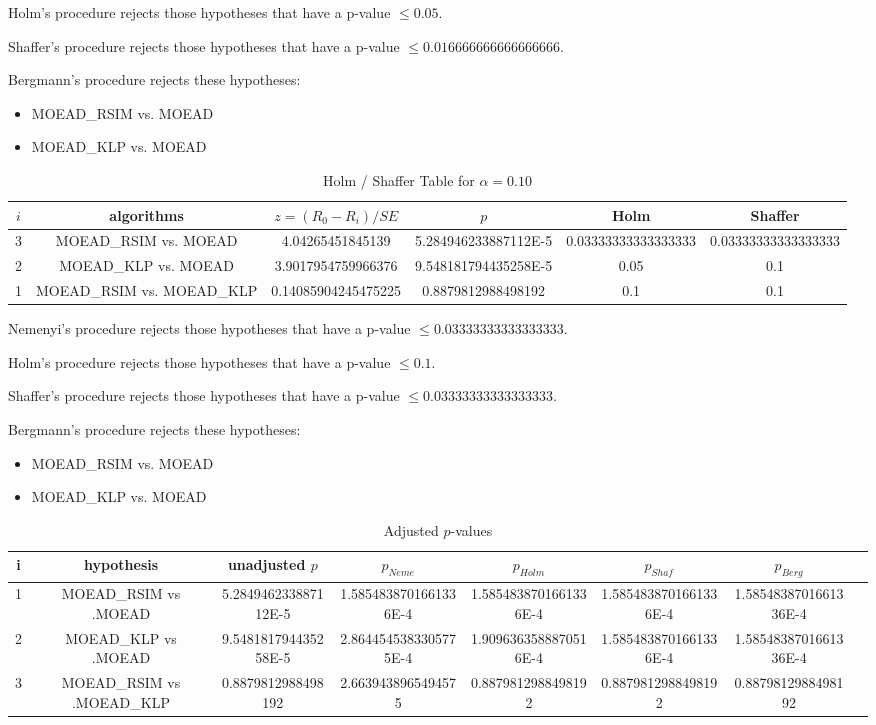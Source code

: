 \documentclass[a4paper,10pt]{article}
\begin{document}
\begin{landscape}
Holm's procedure rejects those hypotheses that have a p-value $\le0.05$.


Shaffer's procedure rejects those hypotheses that have a p-value $\le0.016666666666666666$.


Bergmann's procedure rejects these hypotheses:


\begin{itemize}


\item MOEAD_RSIM vs. MOEAD
\item MOEAD_KLP vs. MOEAD
\end{itemize}


\begin{table}[!htp]
\centering\tiny
\caption{Holm / Shaffer Table for $\alpha=0.10$}
\begin{tabular}{cccccc}
$i$&algorithms&$z=(R_0 - R_i)/SE$&$p$&Holm&Shaffer\\
\hline
3&MOEAD_RSIM vs. MOEAD&4.04265451845139&5.284946233887112E-5&0.03333333333333333&0.03333333333333333\\
2&MOEAD_KLP vs. MOEAD&3.9017954759966376&9.548181794435258E-5&0.05&0.1\\
1&MOEAD_RSIM vs. MOEAD_KLP&0.14085904245475225&0.8879812988498192&0.1&0.1\\
\hline
\end{tabular}
\end{table}
Nemenyi's procedure rejects those hypotheses that have a p-value $\le0.03333333333333333$.


Holm's procedure rejects those hypotheses that have a p-value $\le0.1$.


Shaffer's procedure rejects those hypotheses that have a p-value $\le0.03333333333333333$.


Bergmann's procedure rejects these hypotheses:


\begin{itemize}


\item MOEAD_RSIM vs. MOEAD
\item MOEAD_KLP vs. MOEAD
\end{itemize}


\begin{table}[!htp]
\centering\tiny
\caption{Adjusted $p$-values}
\begin{tabular}{cccccccc}
i&hypothesis&unadjusted $p$&$p_{Neme}$&$p_{Holm}$&$p_{Shaf}$&$p_{Berg}$\\
\hline
1&MOEAD_RSIM vs .MOEAD&5.284946233887112E-5&1.5854838701661336E-4&1.5854838701661336E-4&1.5854838701661336E-4&1.5854838701661336E-4\\
2&MOEAD_KLP vs .MOEAD&9.548181794435258E-5&2.8644545383305775E-4&1.9096363588870516E-4&1.5854838701661336E-4&1.5854838701661336E-4\\
3&MOEAD_RSIM vs .MOEAD_KLP&0.8879812988498192&2.6639438965494575&0.8879812988498192&0.8879812988498192&0.8879812988498192\\
\hline
\end{tabular}
\end{table}

\end{landscape}
\end{document}
